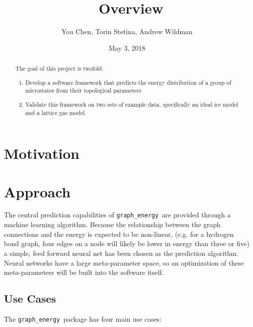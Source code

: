 \documentclass[paper=a4, fontsize=12pt]{article}
\title{
\softname\ Overview
}
\author{You Chen, Torin Stetina, Andrew Wildman}
\date{May 3, 2018}
\newcommand{\softname}{\texttt{graph\_energy}}
\begin{document}
\maketitle


\begin{abstract}
  The goal of this project is twofold:
  \begin{enumerate}
    \item Develop a software framework that predicts the energy distribution of a group of microstates from their topological parameters
    \item Validate this framework on two sets of example data,
      specifically an ideal ice model and a lattice gas model.
  \end{enumerate}
\end{abstract}

\section*{Motivation}


\section*{Approach}


The central prediction capabilities of \softname\ are provided through a machine learning algorithm.
Because the relationship between the graph connections and the energy is expected to be non-linear,
(e.g. for a hydrogen bond graph, four edges on a node will likely be lower in energy than three or five)
a simple, feed forward neural net has been chosen as the prediction algorithm.
Neural networks have a large meta-parameter space,
so an optimization of these meta-parameters will be built into the software itself.

\subsection*{Use Cases}

The \softname\ package has four main use cases:
\end{document}
